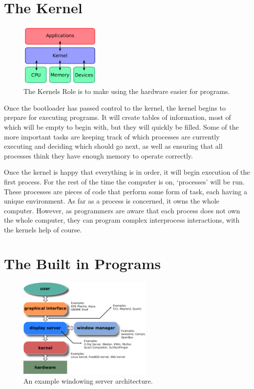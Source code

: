 \documentclass[a4paper]{report}
\begin{document}
\section{The Kernel}

\begin{figure}
\centering
\includegraphics[width=150px]{images/kernel}
\caption{The Kernels Role is to make using the hardware easier for programs.}
\vspace{-10pt}
\label{fig:thekernel}
\end{figure}

Once the bootloader has passed control to the kernel, the kernel begins to prepare for executing programs. It will create tables of information, most of which will be empty to begin with, but they will quickly be filled. Some of the more important tasks are keeping track of which processes are currently executing and deciding which should go next, as well as ensuring that all processes think they have enough memory to operate correctly.

Once the kernel is happy that everything is in order, it will begin execution of the first process. For the rest of the time the computer is on, `processes' will be run. These processes are pieces of code that perform some form of task, each having a unique environment. As far as a process is concerned, it owns the whole computer. However, as programmers are aware that each process does not own the whole computer, they can program complex interprocess interactions, with the kernels help of course.


\section{The Built in Programs}

\begin{figure}
\centering
\includegraphics[width=250px]{images/windowing}
\caption{An example windowing server architecture.}
\label{fig:theserver}
\end{figure}
\end{document}
